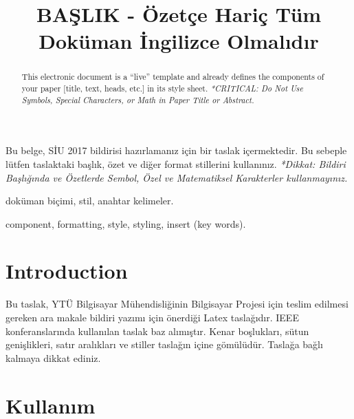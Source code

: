 \documentclass[conference]{IEEEtran}
\begin{document}
\title{BAŞLIK - Özetçe Hariç Tüm Doküman İngilizce Olmalıdır}


\author{
}

\maketitle

\begin{ozet}
Bu belge, SİU 2017 bildirisi hazırlamanız için bir taslak içermektedir. Bu sebeple lütfen taslaktaki başlık, özet ve diğer format stillerini kullanınız.  \textit{*Dikkat:  Bildiri Başlığında ve Özetlerde Sembol, Özel ve Matematiksel Karakterler kullanmayınız.}
\end{ozet}
\begin{IEEEanahtar}
doküman biçimi, stil, anahtar kelimeler.
\end{IEEEanahtar}

\begin{abstract}
This electronic document is a “live” template and already defines the components of your paper [title, text, heads, etc.] in its style sheet.  \textit{*CRITICAL:  Do Not Use Symbols, Special Characters, or Math in Paper Title or Abstract.}
\end{abstract}
\begin{IEEEkeywords}
component, formatting, style, styling, insert (key words).
\end{IEEEkeywords}


\section{Introduction}

Bu taslak, YTÜ Bilgisayar Mühendisliğinin Bilgisayar Projesi için teslim edilmesi gereken ara makale bildiri yazımı için önerdiği Latex taslağıdır. IEEE konferanslarında kullanılan taslak baz alımıştır. Kenar boşlukları, sütun genişlikleri, satır aralıkları ve stiller taslağın içine gömülüdür.  Taslağa bağlı kalmaya dikkat ediniz.\cite{WinNT}

\section{Kullanım}
\end{document}
